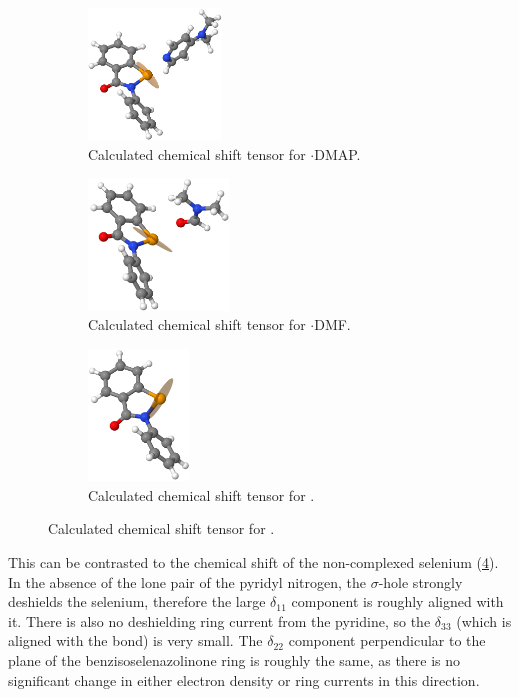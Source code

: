 \begin{refsection}
\begin{figure}
  \centering
  \begin{subfigure}{0.3\linewidth}
    \centering
    \includegraphics[height=3.5cm]{Figures/77se-tensor-ebs-dmap.png}
    \caption{Calculated chemical shift tensor for $\cdot$DMAP.}
    \label{fig:77se-tensor-ebs-dmap}
  \end{subfigure}
  \begin{subfigure}{0.3\linewidth}
    \centering
    \includegraphics[height=3.5cm]{Figures/77se-tensor-ebs-dmf.png}
    \caption{Calculated chemical shift tensor for $\cdot$DMF.}
    \label{fig:77se-tensor-ebs-dmf}
  \end{subfigure}
  \begin{subfigure}{0.3\linewidth}
    \centering
    \includegraphics[height=3.5cm]{Figures/77se-tensor-ebs.png}
    \caption{Calculated chemical shift tensor for .}
    \label{fig:77se-tensor-ebs}
  \end{subfigure}
\end{figure}

This can be contrasted to the chemical shift of the non-complexed selenium (\cref{fig:77se-tensor-ebs}).
In the absence of the lone pair of the pyridyl nitrogen, the $\sigma$-hole strongly deshields the selenium, therefore the large $\delta_{11}$ component is roughly aligned with it.
There is also no deshielding ring current from the pyridine, so the $\delta_{33}$ (which is aligned with the  bond) is very small.
The $\delta_{22}$ component perpendicular to the plane of the benzisoselenazolinone ring is roughly the same, as there is no significant change in either electron density or ring currents in this direction.


\end{refsection}
